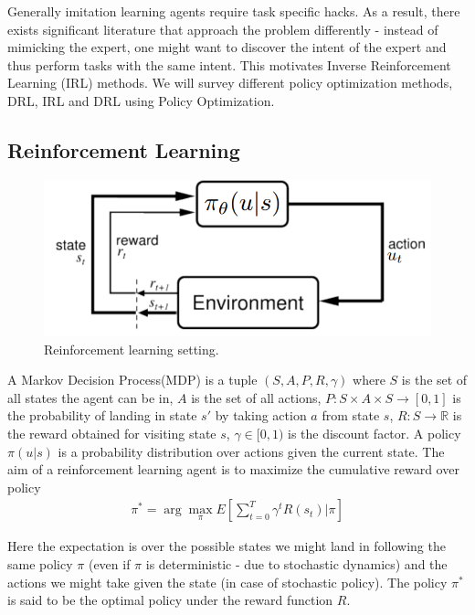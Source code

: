 \documentclass[11pt]{article}
\begin{document}
Generally imitation learning agents require task specific hacks. As a result, there exists significant literature that approach the problem differently - instead of mimicking the expert, one might want to discover the intent of the expert and thus perform tasks with the same intent. This motivates Inverse Reinforcement Learning (IRL) methods. We will survey different policy optimization methods, DRL, IRL and DRL using Policy Optimization. 


\subsection{Reinforcement Learning}

\begin{figure}[H]
  \begin{center}
    \includegraphics[width=0.7\linewidth]{images/rl.png}
    \caption{Reinforcement learning setting. \cite{drlnips}}
    \label{fig:rl}
  \end{center}
\end{figure}
A Markov Decision Process(MDP) is a tuple $(S,A,P,R,\gamma)$ where $S$ is the set of all states the agent can be in, $A$ is the set of all actions, $P : S \times A \times S \to [0,1]$ is the probability of landing in state $s'$ by taking action $a$ from state $s$, $R: S \to \mathbb{R}$ is the reward obtained for visiting state $s$, $\gamma \in [0,1)$ is the discount factor. A policy $\pi(u|s)$ is a probability distribution over actions given the current state. The aim of a reinforcement learning agent is to maximize the cumulative reward over policy 
\begin{align}
  \pi^* = \arg \max_\pi E[\sum_{t=0}^T \gamma^t R(s_t)|\pi]
\end{align}

	
Here the expectation is over the possible states we might land in following the same policy $\pi$ (even if $\pi$ is deterministic - due to stochastic dynamics) and the actions we might take given the state (in case of stochastic policy). The policy $\pi^*$ is said to be the optimal policy under the reward function $R$. 
\end{document}
